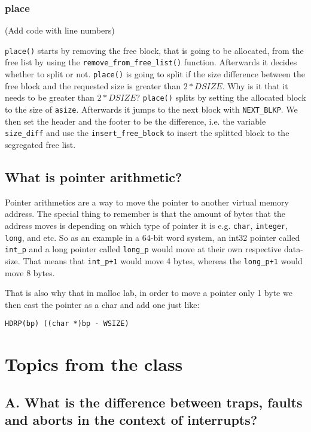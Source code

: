 \documentclass[11pt]{article}
\newcommand{\code}[1]{{\colorbox{lightgray!20}{\color{orange}\texttt{#1}}}}
\newcommand{\temp}[1]{{\color{red}#1}}
\begin{document}
\subsubsection{place}
\temp{(Add code with line numbers)}

\code{place()} starts by removing the free block, that is going to be allocated, from the free list by using the \code{remove\_from\_free\_list()} function. 
Afterwards it decides whether to split or not. \code{place()} is going to split if the size difference between the free block and the requested size is greater than $2 * DSIZE$.
\temp{Why is it that it needs to be greater than $2 * DSIZE$?}
\code{place()} splits by setting the allocated block to the size of \code{asize}. Afterwards it jumps to the next block with \code{NEXT\_BLKP}.
We then set the header and the footer to be the difference, i.e. the variable \code{size\_diff} and use the \code{insert\_free\_block} to insert the splitted block to the segregated free list.

\subsection{What is pointer arithmetic?}
Pointer arithmetics are a way to move the pointer to another virtual memory address. The special thing to remember is that the amount of bytes 
that the address moves is depending on which type of pointer it is e.g. \code{char}, \code{integer}, \code{long}, and etc.
So as an example in a 64-bit word system, an int32 pointer called \code{int\_p} and a long pointer called \code{long\_p} would move at their own respective data-size.
That means that \code{int\_p+1} would move 4 bytes, whereas the \code{long\_p+1} would move 8 bytes.

That is also why that in malloc lab, in order to move a pointer only 1 byte we then cast the pointer as a char and add one just like: 

\code{HDRP(bp) ((char *)bp - WSIZE)}

\section{Topics from the class}

\subsection{A. What is the difference between traps, faults and aborts in the context of interrupts?}
\end{document}
